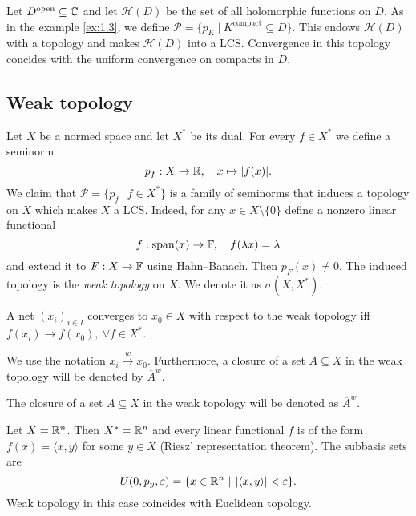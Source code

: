 \begin{example}
        Let $D^{\textrm{open}} \subseteq \mathbb {C}$ and let $\mathcal{H} (D)$ be the set of all holomorphic functions on $D$.
        As in the example \ref{ex:1.3}, we define $\mathcal{P} = \{p_K\ |\ K^{\textrm{compact}} \subseteq D\}$.
        This endows $\mathcal{H}(D)$ with a topology and makes $\mathcal{H}(D)$ into a LCS.
        Convergence in this topology concides with the uniform convergence on compacts in $D$.            
\end{example} 

\subsection{Weak topology}
        
    Let $X$ be a normed space and let $X^*$ be its dual. For every $f \in X^*$ we define a seminorm 
        $$p_f: X \to \mathbb {R},\quad x \mapsto |f(x)|.$$
        We claim that $\mathcal{P} = \{p_f\ |\ f \in X^*\}$ is a family of seminorms that induces a topology on $X$ which makes $X$ a LCS.  
        Indeed, for any $x \in X \setminus \{0\}$ define a nonzero linear functional 
        $$f: \operatorname{span} (x) \to \mathbb {F},\quad f(\lambda x) = \lambda$$
         and extend it to $F: X \to \mathbb {F}$ using Hahn--Banach.
        Then $p_F (x) \neq 0$.
        The induced topology is the \emph{weak topology} on $X$. We denote it as $\sigma(X, X^*)$. 
        
        \begin{proposition}
          A net $(x_i)_{i \in I}$ converges to $x_0 \in X$ with respect to the weak topology iff $f(x_i) \to f(x_0),\ \forall f \in X^*.$          
        \end{proposition}
        
\begin{remark}
        We use the notation $x_i \xrightarrow{w} x_0$. Furthermore, a closure of a set $A \subseteq X$ in the weak topology
        will be denoted by $\overline{A}^w$.  
\end{remark}


\begin{remark}
  The closure of a set $A \subseteq X$ in the weak topology will be denoted as $\overline{A}^w$.
\end{remark}

\begin{example}
  Let $X = \mathbb {R}^n$. Then $X^* = \mathbb {R}^n$ and every linear functional $f$ is of the form 
  $f(x) = \langle x, y \rangle$ for some $y \in X$ (Riesz' representation theorem). The subbasis sets are
  $$U(0, p_y, \varepsilon) = \{x \in \R^n\ |\ |\langle x, y\rangle| < \varepsilon\}.$$
  Weak topology in this case coincides with Euclidean topology.
\end{example} 

